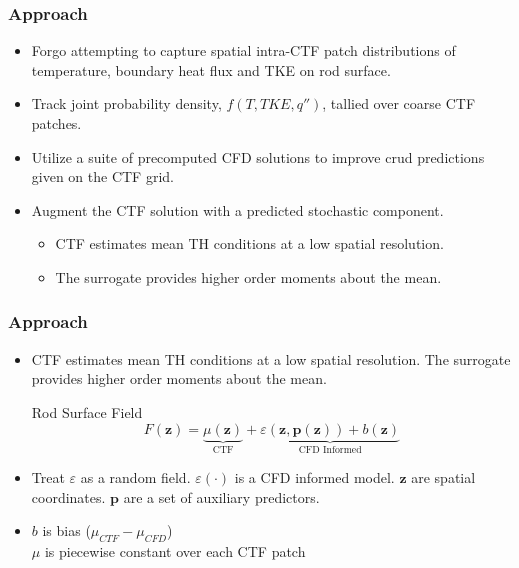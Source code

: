 \documentclass[t, pdftex]{beamer}
\begin{document}
\begin{frame}\frametitle{Approach}
\begin{itemize}
\item Forgo attempting to capture spatial intra-CTF patch distributions of temperature, boundary heat flux and TKE on rod surface. 
\item Track joint probability density, $f(T, TKE, q'')$, tallied over coarse CTF patches.
    \item Utilize a suite of precomputed CFD solutions to improve crud predictions given on the CTF grid. 
    \item Augment the CTF solution with a predicted stochastic component.
    \begin{itemize}
        \item CTF estimates mean TH conditions at a low spatial resolution.  
        \item The surrogate provides higher order moments about the mean.
    \end{itemize}
\end{itemize}
\end{frame}


\begin{frame}
    \frametitle{Approach}
    \vspace{-8pt}
    \begin{itemize}
    \item CTF estimates mean TH conditions at a low spatial resolution.  The surrogate provides higher order moments about the mean.
    
    \begin{block}{Rod Surface Field}
        \[ 
        F(\mathbf z) = \underbrace{\mu(\mathbf{z})}_\text{CTF} + \underbrace{\varepsilon(\mathbf z, {\mathbf p(\mathbf z)}) + b(\mathbf{z}) }_\text{CFD Informed}
        \]
    \end{block}
    \item Treat $\varepsilon$ as a random field.  $\varepsilon(\cdot)$ is a CFD informed model. $\mathbf z$ are spatial coordinates. $\mathbf p$ are a set of auxiliary predictors. \\
    \item $b$ is bias ($\mu_{CTF} - \mu_{CFD}$) \\
    $\mu$ is piecewise constant over each CTF patch
\end{itemize}
\end{frame}
\end{document}
